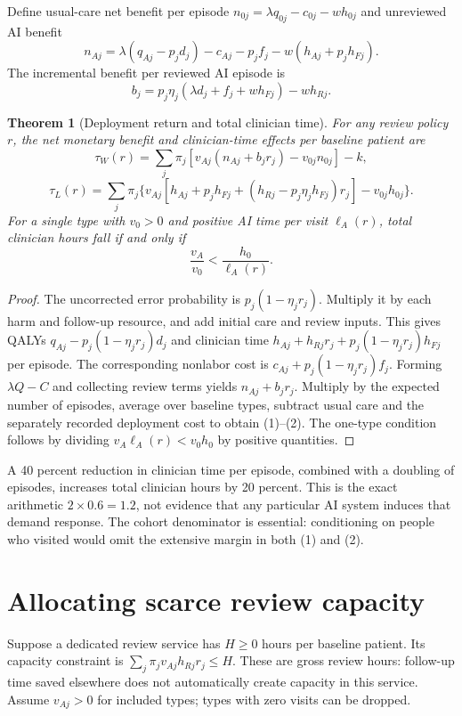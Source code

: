 \documentclass[11pt,a4paper]{article}
\newtheorem{theorem}{Theorem}[section]
\theoremstyle{definition}
\theoremstyle{remark}
\begin{document}
Define usual-care net benefit per episode $n_{0j}=\lambda q_{0j}-c_{0j}-wh_{0j}$ and unreviewed AI benefit
\[
 n_{Aj}=\lambda(q_{Aj}-p_jd_j)-c_{Aj}-p_jf_j-w(h_{Aj}+p_jh_{Fj}).
\]
The incremental benefit per reviewed AI episode is
\[
 b_j=p_j\eta_j(\lambda d_j+f_j+wh_{Fj})-wh_{Rj}.
\]

\begin{theorem}[Deployment return and total clinician time]
For any review policy $r$, the net monetary benefit and clinician-time effects per baseline patient are
\[
 \tau_W(r)=\sum_j\pi_j[v_{Aj}(n_{Aj}+b_jr_j)-v_{0j}n_{0j}]-k,\tag{1}
\]
\[
 \tau_L(r)=\sum_j\pi_j\{v_{Aj}[h_{Aj}+p_jh_{Fj}
 +(h_{Rj}-p_j\eta_jh_{Fj})r_j]-v_{0j}h_{0j}\}.\tag{2}
\]
For a single type with $v_0>0$ and positive AI time per visit $\ell_A(r)$, total clinician hours fall if and only if
\[
 \frac{v_A}{v_0}<\frac{h_0}{\ell_A(r)}.
\]
\end{theorem}
\begin{proof}
The uncorrected error probability is $p_j(1-\eta_jr_j)$. Multiply it by each harm and follow-up resource, and add initial care and review inputs. This gives QALYs $q_{Aj}-p_j(1-\eta_jr_j)d_j$ and clinician time $h_{Aj}+h_{Rj}r_j+p_j(1-\eta_jr_j)h_{Fj}$ per episode. The corresponding nonlabor cost is $c_{Aj}+p_j(1-\eta_jr_j)f_j$. Forming $\lambda Q-C$ and collecting review terms yields $n_{Aj}+b_jr_j$. Multiply by the expected number of episodes, average over baseline types, subtract usual care and the separately recorded deployment cost to obtain (1)--(2). The one-type condition follows by dividing $v_A\ell_A(r)<v_0h_0$ by positive quantities.
\end{proof}

A 40 percent reduction in clinician time per episode, combined with a doubling of episodes, increases total clinician hours by 20 percent. This is the exact arithmetic $2\times0.6=1.2$, not evidence that any particular AI system induces that demand response. The cohort denominator is essential: conditioning on people who visited would omit the extensive margin in both (1) and (2).

\section{Allocating scarce review capacity}
Suppose a dedicated review service has $H\geq0$ hours per baseline patient. Its capacity constraint is $\sum_j\pi_jv_{Aj}h_{Rj}r_j\leq H$. These are gross review hours: follow-up time saved elsewhere does not automatically create capacity in this service. Assume $v_{Aj}>0$ for included types; types with zero visits can be dropped.
\end{document}
